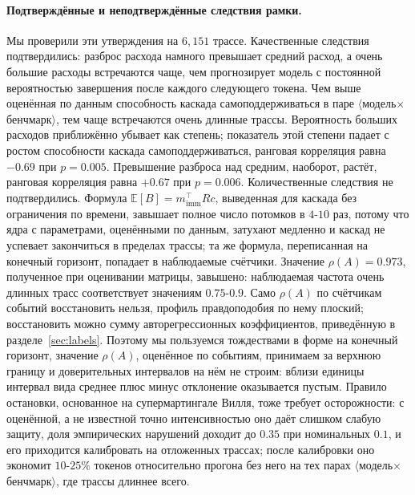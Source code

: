 \documentclass[11pt]{article}
\begin{document}
\paragraph{Подтверждённые и неподтверждённые следствия рамки.} Мы проверили эти утверждения на $6{,}151$ трассе. Качественные следствия подтвердились: разброс расхода намного превышает средний расход, а очень большие расходы встречаются чаще, чем прогнозирует модель с постоянной вероятностью завершения после каждого следующего токена. Чем выше оценённая по данным способность каскада самоподдерживаться в паре $\langle$модель$\times$бенчмарк$\rangle$, тем чаще встречаются очень длинные трассы. Вероятность больших расходов приближённо убывает как степень; показатель этой степени падает с ростом способности каскада самоподдерживаться, ранговая корреляция равна $-0.69$ при $p=0.005$. Превышение разброса над средним, наоборот, растёт, ранговая корреляция равна $+0.67$ при $p=0.006$. Количественные следствия не подтвердились. Формула $\mathbb E[B]=m_{\mathrm{imm}}^{\top}Rc$, выведенная для каскада без ограничения по времени, завышает полное число потомков в $4$-$10$ раз, потому что ядра с параметрами, оценёнными по данным, затухают медленно и каскад не успевает закончиться в пределах трассы; та же формула, переписанная на конечный горизонт, попадает в наблюдаемые счётчики. Значение $\rho(A)=0.973$, полученное при оценивании матрицы, завышено: наблюдаемая частота очень длинных трасс соответствует значениям $0.75$-$0.9$. Само $\rho(A)$ по счётчикам событий восстановить нельзя, профиль правдоподобия по нему плоский; восстановить можно сумму авторегрессионных коэффициентов, приведённую в разделе~\ref{sec:labels}. Поэтому мы пользуемся тождествами в форме на конечный горизонт, значение $\rho(A)$, оценённое по событиям, принимаем за верхнюю границу и доверительных интервалов на нём не строим: вблизи единицы интервал вида среднее плюс минус отклонение оказывается пустым. Правило остановки, основанное на супермартингале Вилля, тоже требует осторожности: с оценённой, а не известной точно интенсивностью оно даёт слишком слабую защиту, доля эмпирических нарушений доходит до $0.35$ при номинальных $0.1$, и его приходится калибровать на отложенных трассах; после калибровки оно экономит $10$-$25\%$ токенов относительно прогона без него на тех парах $\langle$модель$\times$бенчмарк$\rangle$, где трассы длиннее всего.
\end{document}
